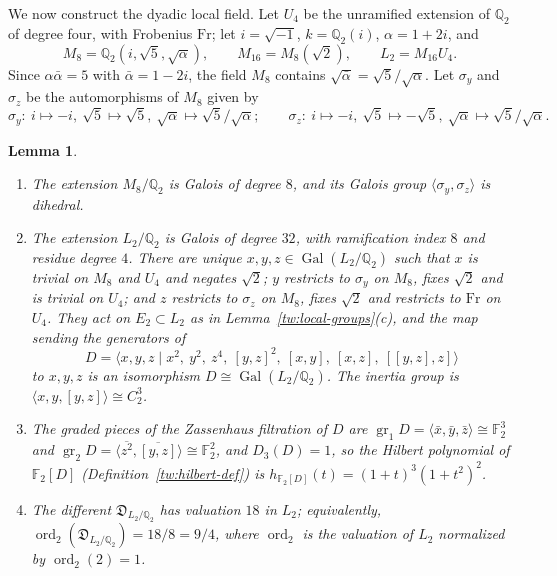 \documentclass[11pt]{amsart}
\numberwithin{equation}{section}
\newtheorem{lemma}[equation]{Lemma}
\theoremstyle{definition}
\theoremstyle{remark}
\DeclareMathOperator{\Gal}{Gal}
\newcommand{\Ftwo}{\mathbb F_2}
\newcommand{\Q}{\mathbb Q}
\begin{document}
We now construct the dyadic local field. Let $U_4$ be the
unramified extension of $\Q_2$ of degree four, with Frobenius $\mathrm{Fr}$;
let $i=\sqrt{-1}$, $k=\Q_2(i)$, $\alpha=1+2i$, and
\[
 M_8=\Q_2(i,\sqrt5,\sqrt\alpha),\qquad M_{16}=M_8(\sqrt2),\qquad
 L_2=M_{16}U_4 .
\]
Since $\alpha\bar\alpha=5$ with $\bar\alpha=1-2i$, the field $M_8$ contains
$\sqrt{\bar\alpha}=\sqrt5/\sqrt\alpha$. Let $\sigma_y$ and $\sigma_z$ be the
automorphisms of $M_8$ given by
\[
 \sigma_y:\ i\mapsto-i,\ \sqrt5\mapsto\sqrt5,\ \sqrt\alpha\mapsto\sqrt5/\sqrt\alpha;
 \qquad
 \sigma_z:\ i\mapsto-i,\ \sqrt5\mapsto-\sqrt5,\ \sqrt\alpha\mapsto\sqrt5/\sqrt\alpha.
\]

\begin{lemma}\label{tw:local-two}
\begin{enumerate}
\item[(a)] The extension $M_8/\Q_2$ is Galois of degree $8$, and its Galois
 group $\langle\sigma_y,\sigma_z\rangle$ is dihedral.
\item[(b)] The extension $L_2/\Q_2$ is Galois of degree $32$, with
 ramification index $8$ and residue degree $4$. There are unique
 $x,y,z\in\Gal(L_2/\Q_2)$ such that $x$ is trivial on $M_8$ and $U_4$ and
 negates $\sqrt2$; $y$ restricts to $\sigma_y$ on $M_8$, fixes $\sqrt2$ and
 is trivial on $U_4$; and $z$ restricts to $\sigma_z$ on $M_8$, fixes $\sqrt2$
 and restricts to $\mathrm{Fr}$ on $U_4$. They act on $E_2\subset L_2$ as in
 Lemma~\ref{tw:local-groups}(c), and the map sending the generators of
 \[
  D=\langle x,y,z\mid x^2,\ y^2,\ z^4,\ [y,z]^2,\ [x,y],\ [x,z],\ [[y,z],z]\rangle
 \]
 to $x,y,z$ is an isomorphism $D\cong\Gal(L_2/\Q_2)$. The inertia group is
 $\langle x,y,[y,z]\rangle\cong C_2^3$.
\item[(c)] The graded pieces of the Zassenhaus filtration of $D$ are
 $\operatorname{gr}_1D=\langle\bar x,\bar y,\bar z\rangle\cong\Ftwo^3$ and
 $\operatorname{gr}_2D=\langle\overline{z^2},\overline{[y,z]}\rangle\cong\Ftwo^2$,
 and $D_3(D)=1$, so the Hilbert polynomial of $\Ftwo[D]$
 (Definition~\ref{tw:hilbert-def}) is $h_{\Ftwo[D]}(t)=(1+t)^3(1+t^2)^2$.
\item[(d)] The different $\mathfrak D_{L_2/\Q_2}$ has valuation $18$ in $L_2$;
 equivalently, $\operatorname{ord}_2(\mathfrak D_{L_2/\Q_2})=18/8=9/4$, where
 $\operatorname{ord}_2$ is the valuation of $L_2$ normalized by
 $\operatorname{ord}_2(2)=1$.
\end{enumerate}
\end{lemma}
\end{document}
